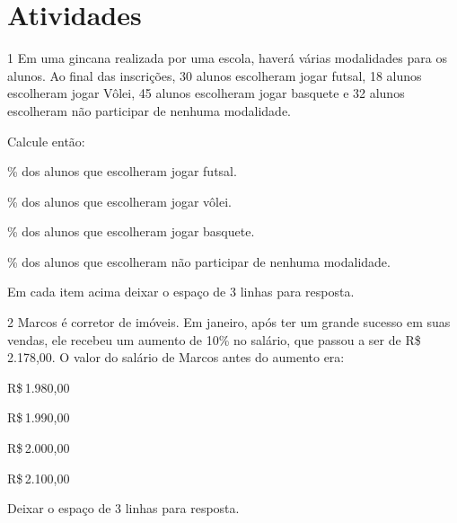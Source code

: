 \section{Atividades}

\num{1} Em uma gincana realizada por uma escola, haverá várias modalidades
para os alunos. Ao final das inscrições, 30 alunos escolheram jogar
futsal, 18 alunos escolheram jogar Vôlei, 45 alunos escolheram jogar
basquete e 32 alunos escolheram não participar de nenhuma modalidade.

Calcule então:

\begin{escolha}[itemsep=-5pt]
\item \% dos alunos que escolheram jogar futsal.\\
\item \% dos alunos que escolheram jogar vôlei.\\
\item \% dos alunos que escolheram jogar basquete.\\
\item \% dos alunos que escolheram não participar de nenhuma modalidade.\\
\end{escolha}

Em cada item acima deixar o espaço de 3 linhas para resposta.






\num{2} Marcos é corretor de imóveis. Em janeiro, após ter um grande sucesso
em suas vendas, ele recebeu um aumento de 10\% no salário, que passou a
ser de R\$\,2.178,00. O valor do salário de Marcos antes do aumento era:

\begin{escolha}
\item R\$\,1.980,00
\item R\$\,1.990,00
\item R\$\,2.000,00
\item R\$\,2.100,00
\end{escolha}


Deixar o espaço de 3 linhas para resposta.

\\
\\

